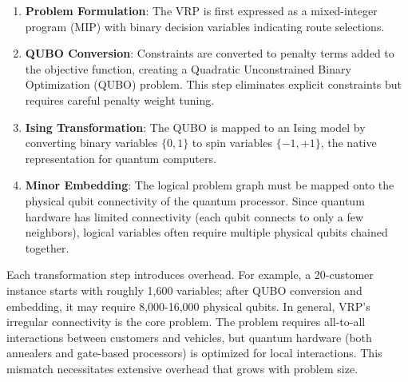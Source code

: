 \documentclass[preprint,3p,12pt,authoryear]{elsarticle}
\begin{document}
\begin{enumerate}
\item \textbf{Problem Formulation}: The VRP is first expressed as a mixed-integer program (MIP) with binary decision variables indicating route selections.
\item \textbf{QUBO Conversion}: Constraints are converted to penalty terms added to the objective function, creating a Quadratic Unconstrained Binary Optimization (QUBO) problem. This step eliminates explicit constraints but requires careful penalty weight tuning.
\item \textbf{Ising Transformation}: The QUBO is mapped to an Ising model by converting binary variables $\{0,1\}$ to spin variables $\{-1,+1\}$, the native representation for quantum computers.
\item \textbf{Minor Embedding}: The logical problem graph must be mapped onto the physical qubit connectivity of the quantum processor. Since quantum hardware has limited connectivity (each qubit connects to only a few neighbors), logical variables often require multiple physical qubits chained together.
\end{enumerate}

Each transformation step introduces overhead. For example, a 20-customer instance starts with roughly 1,600 variables; after QUBO conversion and embedding, it may require 8,000-16,000 physical qubits. 
In general, VRP's irregular connectivity is the core problem. The problem requires all-to-all interactions between customers and vehicles, but quantum hardware (both annealers and gate-based processors) is optimized for local interactions. This mismatch necessitates extensive overhead that grows with problem size.
\end{document}

